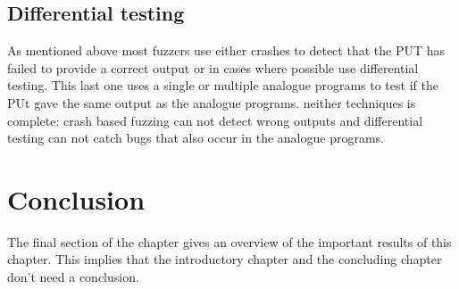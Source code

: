\subsection{Differential testing}
As mentioned above most fuzzers use either crashes to detect that the PUT has failed to provide a correct output or in cases where possible use differential testing. This last one uses a single or multiple analogue programs to test if the PUt gave the same output as the analogue programs. neither techniques is complete: crash based fuzzing can not detect wrong outputs and differential testing can not catch bugs that also occur in the analogue programs.




\section{Conclusion}
The final section of the chapter gives an overview of the important results
of this chapter. This implies that the introductory chapter and the
concluding chapter don't need a conclusion.


